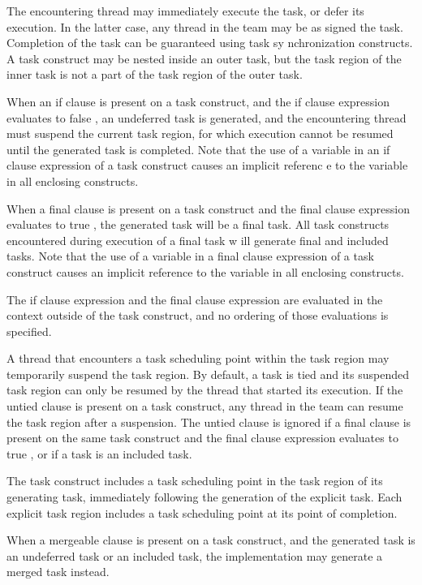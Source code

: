 The encountering thread may immediately execute the task, or defer its execution. In the latter case, any thread in the team may be as signed the task. Completion of the task can be guaranteed using task sy nchronization constructs. A task construct may be nested inside an outer task, but the task region of the inner task is not a part of the task region of the outer task.

When an if clause is present on a task construct, and the if clause expression evaluates to false , an undeferred task is generated, and the encountering thread must suspend the current task region, for which execution cannot be resumed until the generated task is completed. Note that the use of a variable in an if clause expression of a task construct causes an implicit referenc e to the variable in all enclosing constructs.

When a final clause is present on a task construct and the final clause expression evaluates to true , the generated task will be a final task. All task constructs encountered during execution of a final task w ill generate final and included tasks. Note that the use of a variable in a final clause expression of a task construct causes an implicit reference to the variable in all enclosing constructs.

The if clause expression and the final clause expression are evaluated in the context outside of the task construct, and no ordering of those evaluations is specified.

A thread that encounters a task scheduling point within the task region may temporarily suspend the task region. By default, a task is tied and its suspended task region can only be resumed by the thread that started its execution. If the untied clause is present on a task construct, any thread in the team can resume the task region after a suspension. The untied clause is ignored if a final clause is present on the same task construct and the final clause expression evaluates to true , or if a task is an included task.

The task construct includes a task scheduling point in the task region of its generating task, immediately following the generation of the explicit task. Each explicit task region includes a task scheduling point at its point of completion.

When a mergeable clause is present on a task construct, and the generated task is an undeferred task or an included task, the implementation may generate a merged task instead.

